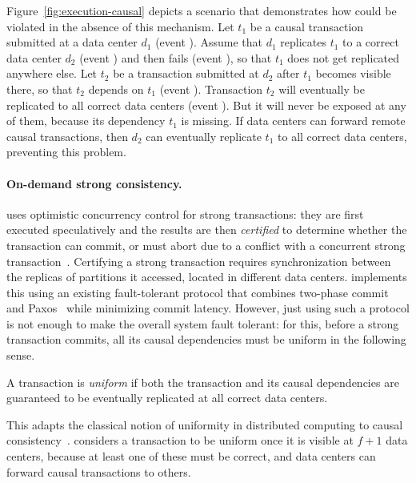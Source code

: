 Figure~\ref{fig:execution-causal}
depicts a scenario that demonstrates how \liveness{} could be
violated in the absence of this mechanism.
Let {\color{\CausalTxColor}$t_1$} be a causal %
transaction submitted at a data center $d_1$ (event ). Assume that
$d_1$ replicates {\color{\CausalTxColor}$t_1$} to a correct data center $d_2$
(event ) and then fails (event ), so that
{\color{\CausalTxColor}$t_1$} does not get replicated anywhere else.
Let {\color{\CausalTxColor}$t_2$} be a %
transaction submitted at $d_2$ after {\color{\CausalTxColor}$t_1$} becomes
visible there, so that {\color{\CausalTxColor}$t_2$} depends on
{\color{\CausalTxColor}$t_1$} (event ). Transaction
{\color{\CausalTxColor}$t_2$} will eventually be replicated to all correct data
centers (event ). But it will never be exposed at any of them,
because its dependency {\color{\CausalTxColor}$t_1$} is missing. If data
centers can forward remote causal transactions, then $d_2$ can
eventually replicate {\color{\CausalTxColor}$t_1$} to all correct data centers,
preventing this problem.









\paragraph{On-demand strong consistency.}
\System uses optimistic concurrency control for strong transactions: they are
first executed speculatively and the results are then {\em certified} to
determine whether the transaction can commit, or must abort due to a conflict
with a concurrent strong transaction~\cite{wv}.
Certifying a strong transaction requires synchronization between the replicas of
partitions it accessed, located in different data centers.
\System implements this using an existing
fault-tolerant protocol that combines two-phase commit and
Paxos~\cite{discpaper} while minimizing commit latency.
However, just using such a protocol is not enough to make the overall system
fault tolerant: for this, before a strong transaction commits, all its causal
dependencies must be uniform in the following sense.
\begin{definition}
  A transaction is {\em uniform} if both the transaction and its causal
  dependencies are guaranteed to be eventually replicated at all correct data
  centers.
\label{def:uniform}
\end{definition}
This adapts the classical notion of uniformity in distributed computing to
causal consistency~\cite{cachin-book}. \System considers a transaction to be
uniform once it is visible at $f+1$ data centers, because at least one of these
must be correct, and
data centers can forward causal transactions to others.

